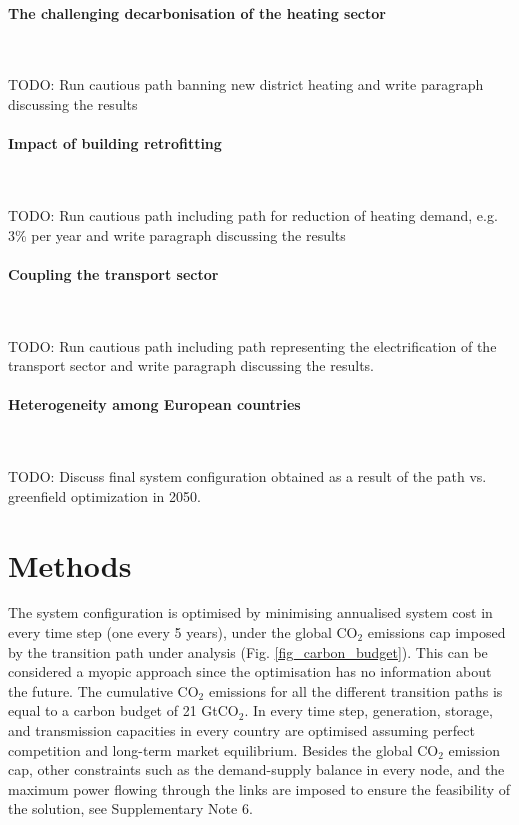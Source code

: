 \documentclass[5p]{elsarticle} %
\begin{document}
\paragraph{\textbf{The challenging decarbonisation of the heating sector}} \

\textcolor[rgb]{1,0,0}{TODO: Run cautious path banning new district heating and write paragraph discussing the results}

\paragraph{\textbf{Impact of building retrofitting}} \

\textcolor[rgb]{1,0,0}{TODO: Run cautious path including path for reduction of heating demand, e.g. 3\% per year and write paragraph discussing the results}

\paragraph{\textbf{Coupling the transport sector}} \

\textcolor[rgb]{1,0,0}{TODO: Run cautious path including path representing the electrification of the transport sector and write paragraph discussing the results.}

\paragraph{\textbf{Heterogeneity among European countries}} \

\textcolor[rgb]{1,0,0}{TODO: Discuss final system configuration obtained as a result of the path vs. greenfield optimization in 2050.}

\section{Methods}

The system configuration is optimised by minimising annualised system cost in every time step (one every 5 years), under the global CO$_2$ emissions cap imposed by the transition path under analysis (Fig. \ref{fig_carbon_budget}). This can be considered a myopic approach since the optimisation has no information about the future. The cumulative CO$_2$ emissions for all the different transition paths is equal to a carbon budget of 21 GtCO$_2$. In every time step, generation, storage, and transmission capacities in every country are optimised assuming perfect competition and long-term market equilibrium. Besides the global CO$_2$ emission cap, other constraints such as the demand-supply balance in every node, and the maximum power flowing through the links are imposed to ensure the feasibility of the solution, see Supplementary Note 6. \
\end{document}
